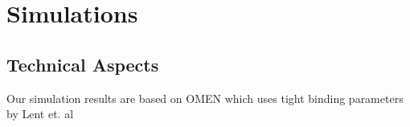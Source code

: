 \chapter{Simulations}

	\section{Technical Aspects}
		Our simulation results are based on OMEN which uses tight binding parameters by Lent et. al \cite{Lent1986}